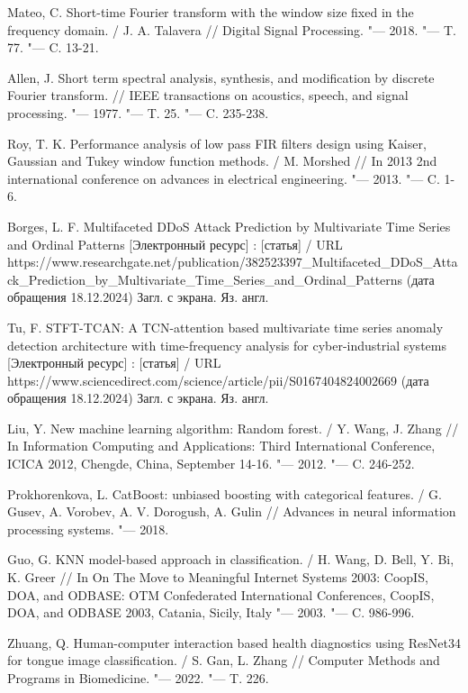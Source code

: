 \documentclass[spec, och, diploma]{SCWorks}
\begin{document}
\begin{thebibliography}{99}
     Mateo, C. Short-time Fourier transform with the window size
    fixed in the frequency domain. / J. A. Talavera // Digital Signal
    Processing. "--- 2018. "--- T. 77. "--- C. 13-21.
    
     Allen, J. Short term spectral analysis, synthesis, and
    modification by discrete Fourier transform. // IEEE transactions on
    acoustics, speech, and signal processing. "--- 1977. "--- T. 25. "--- C.
    235-238.

     Roy, T. K. Performance analysis of low pass FIR filters
    design using Kaiser, Gaussian and Tukey window function methods. / M.
    Morshed // In 2013 2nd international conference on advances in electrical
    engineering. "--- 2013. "--- C. 1-6.

     Borges, L. F. Multifaceted DDoS Attack Prediction by
    Multivariate Time Series and Ordinal Patterns [Электронный ресурс] :
    [статья] / URL
    https://www.researchgate.net/publication/382523397_Multifaceted_DDoS_Attack_Prediction_by_Multivariate_Time_Series_and_Ordinal_Patterns
    (дата обращения 18.12.2024) Загл. с экрана. Яз. англ.

     Tu, F. STFT-TCAN: A TCN-attention based multivariate
    time series anomaly detection architecture with time-frequency analysis for
    cyber-industrial systems [Электронный ресурс] : [статья] / URL
    https://www.sciencedirect.com/science/article/pii/S0167404824002669 (дата
    обращения 18.12.2024) Загл. с экрана. Яз. англ.

     Liu, Y. New machine learning algorithm: Random forest. / Y.
    Wang, J. Zhang // In Information Computing and Applications: Third
    International Conference, ICICA 2012, Chengde, China, September 14-16. "---
    2012. "--- C. 246-252.

     Prokhorenkova, L. CatBoost: unbiased boosting with
    categorical features. / G. Gusev, A. Vorobev, A. V. Dorogush, A. Gulin //
    Advances in neural information processing systems. "--- 2018.

     Guo, G. KNN model-based approach in classification. / H. Wang,
    D. Bell, Y. Bi, K. Greer // In On The Move to Meaningful Internet Systems
    2003: CoopIS, DOA, and ODBASE: OTM Confederated International Conferences,
    CoopIS, DOA, and ODBASE 2003, Catania, Sicily, Italy "--- 2003. "--- C.
    986-996.

     Zhuang, Q. Human-computer interaction based health
    diagnostics using ResNet34 for tongue image classification. / S. Gan, L.
    Zhang // Computer Methods and Programs in Biomedicine. "--- 2022. "--- T.
    226.


\end{thebibliography}
\end{document}
